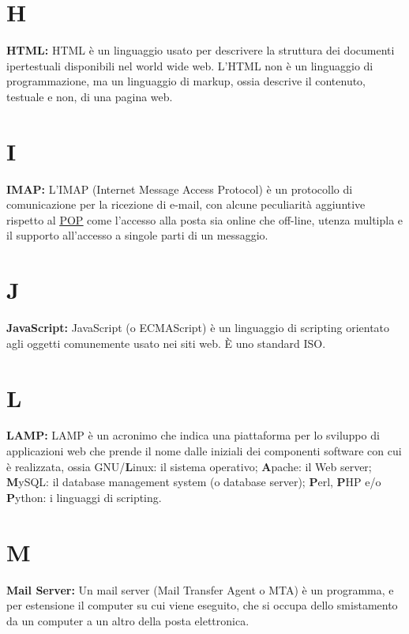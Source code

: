 {\section*{H}
\hypertarget{html}{}
\textbf{HTML:}
HTML \` e un linguaggio usato per descrivere la struttura dei documenti ipertestuali disponibili nel world wide web.
L'HTML non \` e un linguaggio di programmazione, ma un linguaggio di markup, ossia descrive il contenuto, testuale e non, di una pagina web.\\

\section*{I}
\hypertarget{imap}{}
\textbf{IMAP:}
L'IMAP (Internet Message Access Protocol) \`e un protocollo di comunicazione per la ricezione di e-mail, con alcune peculiarit\`a aggiuntive rispetto al \hyperlink{pop}{\underline{POP}} come l'accesso alla posta sia online che off-line, utenza multipla e il supporto all'accesso a singole parti di un messaggio.

\section*{J}
\hypertarget{javascript}{}
\textbf{JavaScript:}
JavaScript (o ECMAScript) \`e un linguaggio di scripting orientato agli oggetti comunemente usato nei siti web. \`E  uno standard ISO.\\

\section*{L}
\hypertarget{lamp}{}
\textbf{LAMP:}
LAMP \`e un acronimo che indica una piattaforma per lo sviluppo di applicazioni web che prende il nome dalle iniziali dei componenti software con cui è realizzata, ossia GNU/\textbf{L}inux: il sistema operativo; \textbf{A}pache: il Web server; \textbf{M}ySQL: il database management system (o database server); \textbf{P}erl, \textbf{P}HP e/o \textbf{P}ython: i linguaggi di scripting.

\section*{M}
\hypertarget{mail_server}{}
\textbf{Mail Server:}
Un mail server (Mail Transfer Agent o MTA) \`e un programma, e per estensione il computer su cui viene eseguito, che si occupa dello smistamento da un computer a un altro della posta elettronica.\\

}
